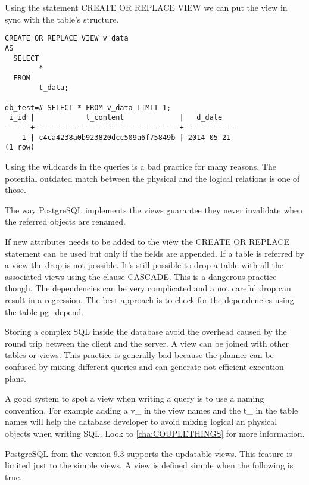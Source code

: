 Using the statement CREATE OR REPLACE VIEW we can put the view in sync with the table's structure.

\begin{lstlisting}[style=pgsql]
 CREATE OR REPLACE VIEW v_data 
AS 
  SELECT 
        *
  FROM 
        t_data;
        
db_test=# SELECT * FROM v_data LIMIT 1;
 i_id |            t_content             |   d_date   
------+----------------------------------+------------
    1 | c4ca4238a0b923820dcc509a6f75849b | 2014-05-21
(1 row)

\end{lstlisting}

Using the wildcards in the queries is a bad practice for many reasons. The potential outdated
match between the physical and the logical relations is one of those.\newline

The way PostgreSQL implements the views guarantee they never invalidate when the referred objects are
renamed. \newline

If new attributes needs to be added to the view the CREATE OR REPLACE statement can be used but only if
the fields are appended. If a table is referred by a view the drop is not possible. It's still possible
to drop a table with all the associated views using the clause CASCADE. This is a dangerous
practice though. The dependencies can be very complicated and a not careful drop can result in a
regression. The best approach is to check for the dependencies using the table pg\_depend.\newline

Storing a complex SQL inside the database avoid the overhead caused by the round trip between the client
and the server. A view can be joined with other tables or views. This practice is generally bad because
the planner can be confused by mixing different queries and can generate not efficient execution
plans.\newline

A good system to spot a view when writing a query is to use a naming convention. For example adding a v\_
in the view names and the t\_ in the table names will help the database developer to avoid
mixing logical an physical objects when writing SQL. Look to \ref{cha:COUPLETHINGS} for more information.

PostgreSQL from the version 9.3 supports the updatable views. This feature is limited just to the
simple views. A view is defined simple when the following is true.

